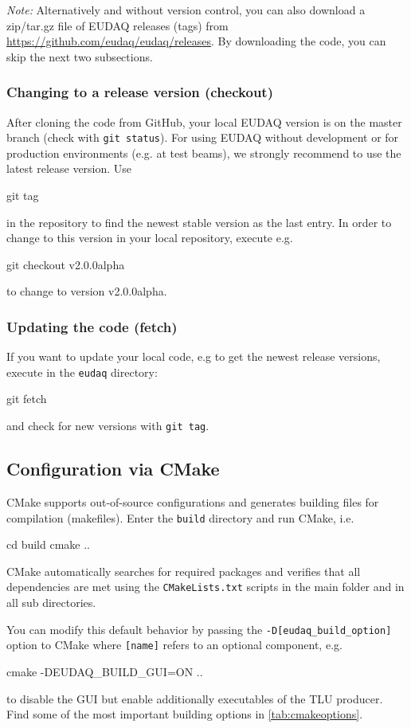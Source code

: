 \textit{Note:} Alternatively and without version control, you can also download a zip/tar.gz file of EUDAQ releases (tags) from \url{https://github.com/eudaq/eudaq/releases}. 
By downloading the code, you can skip the next two subsections. 

\subsubsection{Changing to a release version (checkout)}
After cloning the code from GitHub, your local EUDAQ version is on the master branch (check with \texttt{git status}).  
For using EUDAQ without development or for production environments (e.g. at test beams), we strongly recommend to use the latest release version. 
Use 
\begin{listing}[mybash]
git tag 
\end{listing}
in the repository to find the newest stable version as the last entry.
In order to change to this version in your local repository, execute e.g. 
\begin{listing}[mybash]
git checkout v2.0.0alpha
\end{listing}
to change to version v2.0.0alpha.

\subsubsection{Updating the code (fetch)}
If you want to update your local code, e.g to get the newest release versions, execute in the \texttt{eudaq} directory: 
\begin{listing}[mybash]
git fetch
\end{listing}
and check for new versions with \texttt{git tag}. 


\subsection{Configuration via CMake}
\label{sec:cmake}
CMake supports out-of-source configurations and generates building files for compilation (makefiles). 
Enter the \texttt{build} directory and run CMake, i.e.
\begin{listing}[mybash]
cd build
cmake ..
\end{listing}
CMake automatically searches for required packages and verifies that all dependencies are met using the \texttt{CMakeLists.txt} scripts in the main folder and in all sub directories. 

You can modify this default behavior by passing the \texttt{-D[eudaq\_build\_option]} option to
CMake where \texttt{[name]} refers to an optional component, e.g.
\begin{listing}[mybash]
cmake -DEUDAQ_BUILD_GUI=ON  ..
\end{listing}
to disable the GUI but enable additionally executables of the TLU producer.
Find some of the most important building options in \autoref{tab:cmakeoptions}.

